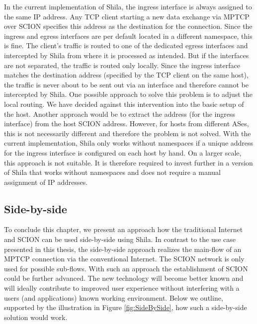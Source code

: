 In the current implementation of Shila, the ingress interface is always assigned to the same IP address. Any TCP client starting a new data exchange via MPTCP over SCION specifies this address as the destination for the connection. Since the ingress and egress interfaces are per default located in a different namespace, this is fine. The client's traffic is routed to one of the dedicated egress interfaces and intercepted by Shila from where it is processed as intended. But if the interfaces are not separated, the traffic is routed only locally. Since the ingress interface matches the destination address (specified by the TCP client on the same host), the traffic is never about to be sent out via an interface and therefore cannot be intercepted by Shila. One possible approach to solve this problem is to adjust the local routing. We have decided against this intervention into the basic setup of the host. Another approach would be to extract the address (for the ingress interface) from the host SCION address. However, for hosts from different ASes, this is not necessarily different and therefore the problem is not solved.  With the current implementation, Shila only works without namespaces if a unique address for the ingress interface is configured on each host by hand. On a larger scale, this approach is not suitable. It is therefore required to invest further in a version of Shila that works without namespaces and does not require a manual assignment of IP addresses.

\subsection*{Side-by-side}

To conclude this chapter, we present an approach how the traditional Internet and SCION can be used side-by-side using Shila. In contrast to the use case presented in this thesis, the side-by-side approach realizes the main-flow of an MPTCP connection via the conventional Internet. The SCION network is only used for possible sub-flows. With such an approach the establishment of SCION could be further advanced. The new technology will become better known and will ideally contribute to improved user experience without interfering with a users (and applications) known working environment. Below we outline, supported by the illustration in Figure \ref{fig:SideBySide}, how such a side-by-side solution would work.


